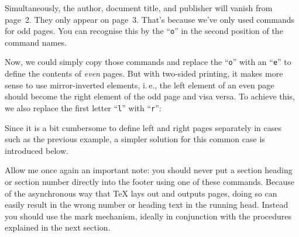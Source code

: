 \begin{Example}
  Simultaneously, the author, document title, and publisher will vanish from
  page~2. They only appear on page~3. That's because we've only used
  commands for odd pages. You can recognise this by the ``\texttt{o}'' in the
  second position of the command names.

  Now, we could simply copy those commands and replace the ``\texttt{o}'' with
  an ``\texttt{e}'' to define the contents of \emph{even} pages. But with
  two-sided printing, it makes more sense to use mirror-inverted elements,
  i.\,e., the left element of an even page should become the right element of
  the odd page and visa versa. To achieve this, we also replace the first
  letter ``\texttt{l}'' with ``\texttt{r}'':
\end{Example}
%
Since it is a bit cumbersome to define left and right pages separately in
cases such as the previous example, a simpler solution for this common case is
introduced below.

Allow me once again an important note: you should
never put a section heading or section number directly into the footer using
one of these commands. Because of the asynchronous way that \TeX{} lays out and
outputs pages, doing so can easily result in the wrong number or heading text
in the running head. Instead you should use the mark mechanism, ideally in
conjunction with the procedures explained in the next section.%
\EndIndexGroup


